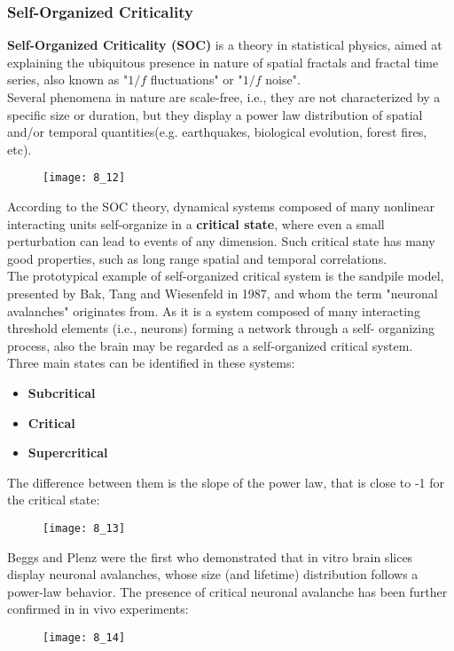\subsubsection{Self-Organized Criticality}
\textbf{Self-Organized Criticality (SOC)} is a theory in statistical physics, aimed at explaining the ubiquitous presence in nature of spatial fractals and fractal time series, also known as "\(1/f\) fluctuations" or "\(1/f\) noise".\\
Several phenomena in nature are scale-free, i.e., they are not characterized by a specific size or duration, but they display a power law distribution of spatial and/or temporal quantities(e.g. earthquakes, biological evolution, forest fires, etc). 
\begin{figure}[H]
    \texttt{[image: 8\_12]}
    \centering
\end{figure}
According to the SOC theory, dynamical systems composed of many nonlinear interacting units self-organize in a \textbf{critical state}, where even a small perturbation can lead to events of any dimension. Such critical state has many good properties, such as long range spatial and temporal correlations.\\
The prototypical example of self-organized critical system is the sandpile model, presented by Bak, Tang and
Wiesenfeld in 1987, and whom the term "neuronal avalanches" originates from. As it is a system composed of many interacting threshold elements (i.e., neurons) forming a network through a self-
organizing process, also the brain may be regarded as a self-organized critical system.\\
Three main states can be identified in these systems:
\begin{itemize}
    \item \textbf{Subcritical}
    \item \textbf{Critical}
    \item \textbf{Supercritical}
\end{itemize}
The difference between them is the slope of the power law, that is close to -1 for the critical state:
\begin{figure}[H]
    \texttt{[image: 8\_13]}
    \centering
\end{figure}
Beggs and Plenz were the first who demonstrated that in vitro brain slices display neuronal avalanches, whose size (and lifetime) distribution follows a power-law behavior. The presence of critical neuronal avalanche has been further confirmed in in vivo experiments:
\begin{figure}[H]
    \texttt{[image: 8\_14]}
    \centering
\end{figure}

